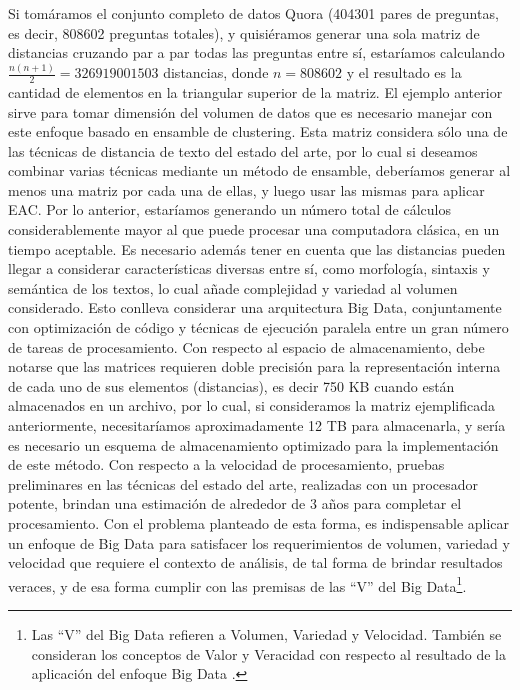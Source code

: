 \bigskip Si tomáramos el conjunto completo de datos Quora (404301 pares de preguntas, es decir, 808602 preguntas totales), y quisiéramos generar una sola matriz de distancias cruzando par a par todas las preguntas entre sí, estaríamos calculando $\frac{n(n+1)}{2} = 326919001503$ distancias, donde $n = 808602$ y el resultado es la cantidad de elementos en la triangular superior de la matriz. El ejemplo anterior sirve para tomar dimensión del volumen de datos que es necesario manejar con este enfoque basado en ensamble de clustering. Esta matriz considera sólo una de las técnicas de distancia de texto del estado del arte, por lo cual si deseamos combinar varias técnicas mediante un método de ensamble, deberíamos generar al menos una matriz por cada una de ellas, y luego usar las mismas para aplicar EAC. Por lo anterior, estaríamos generando un número total de cálculos considerablemente mayor al que puede procesar una computadora clásica, en un tiempo aceptable. Es necesario además tener en cuenta que las distancias pueden llegar a considerar características diversas entre sí, como morfología, sintaxis y semántica de los textos, lo cual añade complejidad y variedad al volumen considerado. Esto conlleva considerar una arquitectura Big Data, conjuntamente con optimización de código y técnicas de ejecución paralela entre un gran número de tareas de procesamiento. Con respecto al espacio de almacenamiento, debe notarse que las matrices requieren doble precisión para la representación interna de cada uno de sus elementos (distancias), es decir 750 KB cuando están almacenados en un archivo, por lo cual, si consideramos la matriz ejemplificada anteriormente, necesitaríamos aproximadamente 12 TB para almacenarla, y sería es necesario un esquema de almacenamiento optimizado para la implementación de este método. Con respecto a la velocidad de procesamiento, pruebas preliminares en las técnicas del estado del arte, realizadas con un procesador potente, brindan una estimación de alrededor de 3 años para completar el procesamiento. Con el problema planteado de esta forma, es indispensable aplicar un enfoque de Big Data para satisfacer los requerimientos de volumen, variedad y velocidad que requiere el contexto de análisis, de tal forma de brindar resultados veraces, y de esa forma cumplir con las premisas de las “V” del Big Data\footnote{Las “V” del Big Data refieren a Volumen, Variedad y Velocidad. También se consideran los conceptos de Valor y Veracidad con respecto al resultado de la aplicación del enfoque Big Data \citep{gandomi2015beyond}.}.


